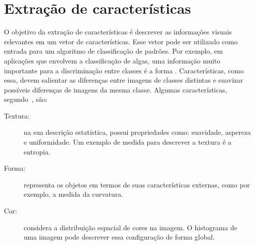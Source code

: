 




\section{Extração de características}
\label{sec:extracao}

O objetivo da extração de características é descrever as informações visuais relevantes em um vetor de características. Esse vetor pode ser utilizado como entrada para um algoritmo de classificação de padrões. Por exemplo, em aplicações que envolvem a classificação de algas, uma informação muito importante para a discriminação entre classes é a forma \cite{Borges2013}. Características, como essa, devem salientar as diferenças entre imagens de classes distintas e suavizar possíveis diferenças de imagens da mesma classe. Algumas características, segundo~, são:

\begin{description}
\item [Textura:] na sua descrição estatística, possui propriedades como: suavidade, aspereza e uniformidade. Um exemplo de medida para descrever a textura é a entropia.
\item [Forma:] representa os objetos em termos de suas características externas, como por exemplo, a medida da curvatura.
\item [Cor:] considera a distribuição espacial de cores na imagem. O histograma de uma imagem pode descrever essa configuração de forma global.
\end{description}

